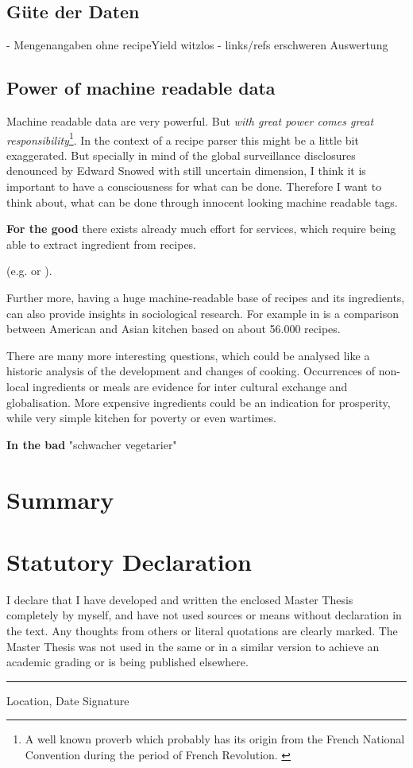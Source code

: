 \documentclass[12pt, twoside]{report}
\begin{document}
\section{Güte der Daten}
- Mengenangaben ohne recipeYield witzlos
- links/refs erschweren Auswertung

\section{Power of machine readable data}
Machine readable data are very powerful. But \textit{with great power comes great responsibility}\footnote{A well known proverb which probably has its origin from the French National Convention during the period of French Revolution. \parencite{quoteInvestigator}}. In the context of a recipe parser this might be a little bit exaggerated. But specially in mind of the global surveillance disclosures denounced by Edward Snowed with still uncertain dimension, I think it is important to have a consciousness for what can be done. Therefore I want to think about, what can be done through innocent looking machine readable tags. 
\bigskip

\textbf{For the good} there exists already much effort for services, which require being able to extract ingredient from recipes.

 (e.g. \cite{ingredientNetworks} or \cite{recipeRecommendation}).

Further more, having a huge machine-readable base of recipes and its ingredients, can also provide insights in sociological research. For example in \parencite{FlavorNetwork} is a comparison between American and Asian kitchen based on about 56.000 recipes.

There are many more interesting questions, which could be analysed like a historic analysis of the development and changes of cooking. Occurrences of non-local ingredients or meals are evidence for inter cultural exchange and globalisation. More expensive ingredients could be an indication for prosperity, while very simple kitchen for poverty or even wartimes.

\textbf{In the bad} \parencite{clintonHealth} "schwacher vegetarier"


\chapter{Summary}


\appendix
\chapter{Statutory Declaration}
I declare that I have developed and written the enclosed Master Thesis completely by myself, and have not used sources or means without declaration in the text. Any thoughts from others or literal quotations are clearly marked. The Master Thesis was not used in the same or in a similar version to achieve an academic grading or is being published elsewhere.
\newline
\newline
\newline
\rule{\textwidth}{1pt}
Location, Date \hfill Signature 
\end{document}
